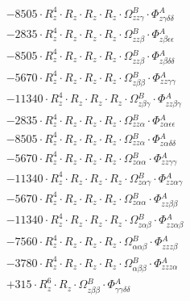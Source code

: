 \documentclass{article}
\begin{document}
\begin{subequations}
\begin{gather}
\begin{array}{c}
 \\[0.2em] 		 - 8505 \cdot R_{z}^{4} \cdot R_{z} \cdot R_{z} \cdot R_{z} \cdot \Omega{}^{B}_{zz\gamma{}} \cdot \Phi{}^{A}_{z\gamma{}\delta{}\delta{}} 
 \\[0.2em] 		 - 2835 \cdot R_{z}^{4} \cdot R_{z} \cdot R_{z} \cdot R_{z} \cdot \Omega{}^{B}_{zz\beta{}} \cdot \Phi{}^{A}_{z\beta{}\epsilon{}\epsilon{}} 
 \\[0.2em] 		 - 8505 \cdot R_{z}^{4} \cdot R_{z} \cdot R_{z} \cdot R_{z} \cdot \Omega{}^{B}_{zz\beta{}} \cdot \Phi{}^{A}_{z\beta{}\delta{}\delta{}} 
 \\[0.2em] 		 - 5670 \cdot R_{z}^{4} \cdot R_{z} \cdot R_{z} \cdot R_{z} \cdot \Omega{}^{B}_{z\beta{}\beta{}} \cdot \Phi{}^{A}_{zz\gamma{}\gamma{}} 
 \\[0.2em] 		 - 11340 \cdot R_{z}^{4} \cdot R_{z} \cdot R_{z} \cdot R_{z} \cdot \Omega{}^{B}_{z\beta{}\gamma{}} \cdot \Phi{}^{A}_{zz\beta{}\gamma{}} 
 \\[0.2em] 		 - 2835 \cdot R_{z}^{4} \cdot R_{z} \cdot R_{z} \cdot R_{z} \cdot \Omega{}^{B}_{zz\alpha{}} \cdot \Phi{}^{A}_{z\alpha{}\epsilon{}\epsilon{}} 
 \\[0.2em] 		 - 8505 \cdot R_{z}^{4} \cdot R_{z} \cdot R_{z} \cdot R_{z} \cdot \Omega{}^{B}_{zz\alpha{}} \cdot \Phi{}^{A}_{z\alpha{}\delta{}\delta{}} 
 \\[0.2em] 		 - 5670 \cdot R_{z}^{4} \cdot R_{z} \cdot R_{z} \cdot R_{z} \cdot \Omega{}^{B}_{z\alpha{}\alpha{}} \cdot \Phi{}^{A}_{zz\gamma{}\gamma{}} 
 \\[0.2em] 		 - 11340 \cdot R_{z}^{4} \cdot R_{z} \cdot R_{z} \cdot R_{z} \cdot \Omega{}^{B}_{z\alpha{}\gamma{}} \cdot \Phi{}^{A}_{zz\alpha{}\gamma{}} 
 \\[0.2em] 		 - 5670 \cdot R_{z}^{4} \cdot R_{z} \cdot R_{z} \cdot R_{z} \cdot \Omega{}^{B}_{z\alpha{}\alpha{}} \cdot \Phi{}^{A}_{zz\beta{}\beta{}} 
 \\[0.2em] 		 - 11340 \cdot R_{z}^{4} \cdot R_{z} \cdot R_{z} \cdot R_{z} \cdot \Omega{}^{B}_{z\alpha{}\beta{}} \cdot \Phi{}^{A}_{zz\alpha{}\beta{}} 
 \\[0.2em] 		 - 7560 \cdot R_{z}^{4} \cdot R_{z} \cdot R_{z} \cdot R_{z} \cdot \Omega{}^{B}_{\alpha{}\alpha{}\beta{}} \cdot \Phi{}^{A}_{zzz\beta{}} 
 \\[0.2em] 		 - 3780 \cdot R_{z}^{4} \cdot R_{z} \cdot R_{z} \cdot R_{z} \cdot \Omega{}^{B}_{\alpha{}\beta{}\beta{}} \cdot \Phi{}^{A}_{zzz\alpha{}} 
 \\[0.2em] 		 + 315 \cdot R_{z}^{6} \cdot R_{z} \cdot \Omega{}^{B}_{z\beta{}\beta{}} \cdot \Phi{}^{A}_{\gamma{}\gamma{}\delta{}\delta{}} 

\end{array}
\end{gather}
\end{subequations}
\end{document}
